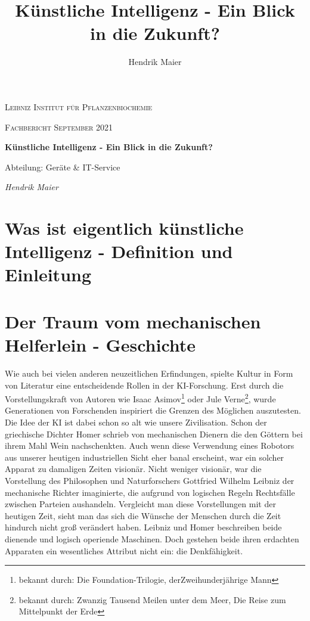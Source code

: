 \documentclass[12pt,german,ngerman]{report}
\title{Künstliche Intelligenz - Ein Blick in die Zukunft?}
\author{Hendrik Maier}
\date{}
\begin{document}
    \begin{titlepage}
        \centering
        {\scshape\LARGE Leibniz Institut für Pflanzenbiochemie\par}
        \vspace{1cm}
        {\scshape\Large Fachbericht September 2021\par}
        \vspace{1.5cm}
        {\huge\bfseries Künstliche Intelligenz - Ein Blick in die Zukunft?\par}
        \vspace{2cm}
        {\Large Abteilung: Geräte \& IT-Service\par}
        \vspace{1.5cm}
        {\Large\itshape Hendrik Maier\par}
        \vfill

    \end{titlepage}

    \tableofcontents
    \newpage

\chapter{Was ist eigentlich künstliche Intelligenz - Definition und Einleitung}
    

\chapter{Der Traum vom mechanischen Helferlein - Geschichte}

Wie auch bei vielen anderen neuzeitlichen Erfindungen, spielte Kultur in Form von Literatur eine entscheidende Rollen
in der KI-Forschung. Erst durch die Vorstellungskraft von Autoren wie Isaac Asimov\footnote{bekannt durch: Die Foundation-Trilogie, derZweihunderjährige Mann}
oder Jule Verne\footnote{bekannt durch: Zwanzig Tausend Meilen unter dem Meer, Die Reise zum Mittelpunkt der Erde}, wurde Generationen
von Forschenden inspiriert die Grenzen des Möglichen auszutesten. Die Idee der KI ist dabei schon so alt wie unsere
Zivilisation. Schon der griechische Dichter Homer schrieb von mechanischen Dienern die den Göttern bei ihrem Mahl
Wein nachschenkten.\cite[53]{buchanan2005very} Auch wenn diese Verwendung eines Robotors aus unserer heutigen
industriellen Sicht eher banal erscheint, war ein solcher Apparat zu damaligen Zeiten visionär.
Nicht weniger visionär, war die Vorstellung des Philosophen und Naturforschers Gottfried Wilhelm Leibniz der mechanische
Richter imaginierte, die aufgrund von logischen Regeln Rechtsfälle zwischen Parteien aushandeln.\cite[53]{buchanan2005very}
Vergleicht man diese Vorstellungen mit der heutigen Zeit, sieht man das sich die Wünsche der Menschen durch die Zeit hindurch
nicht groß verändert haben. Leibniz und Homer beschreiben beide dienende und logisch operiende Maschinen.
Doch gestehen beide ihren erdachten Apparaten ein wesentliches Attribut nicht ein: die Denkfähigkeit. \\
\end{document}
